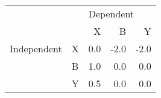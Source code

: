 \begin{tabular}{llrrr}
\toprule
            &   & \multicolumn{3}{l}{Dependent} \\
            &   &         X &    B &    Y \\
\midrule
Independent & X &       0.0 & -2.0 & -2.0 \\
            & B &       1.0 &  0.0 &  0.0 \\
            & Y &       0.5 &  0.0 &  0.0 \\
\bottomrule
\end{tabular}
